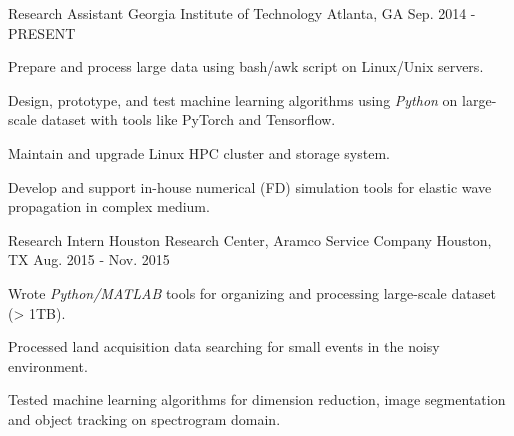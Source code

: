 

\begin{cventries}

  \cventry
    {Research Assistant} %
    {Georgia Institute of Technology} %
    {Atlanta, GA} %
    {Sep. 2014 - PRESENT} %
    {
      \begin{cvitems} %
        \item {Prepare and process large data using bash/awk script on Linux/Unix servers.}        
        \item {Design, prototype, and test machine learning algorithms using \textit{Python} on large-scale dataset with tools like PyTorch and Tensorflow.}
        \item {Maintain and upgrade Linux HPC cluster and storage system.}
        \item {Develop and support in-house numerical (FD) simulation tools for elastic wave propagation in complex medium.}
      \end{cvitems}
    }

  \cventry
    {Research Intern} %
    {Houston Research Center, Aramco Service Company} %
    {Houston, TX} %
    {Aug. 2015 - Nov. 2015} %
    {
      \begin{cvitems} %
        \item {Wrote \textit{Python/MATLAB} tools for organizing and processing large-scale dataset (> 1TB).}
        \item {Processed land acquisition data searching for small events in the noisy environment.}
        \item {Tested machine learning algorithms for dimension reduction, image segmentation and object tracking on spectrogram domain.}
      \end{cvitems}
    }


\end{cventries}
